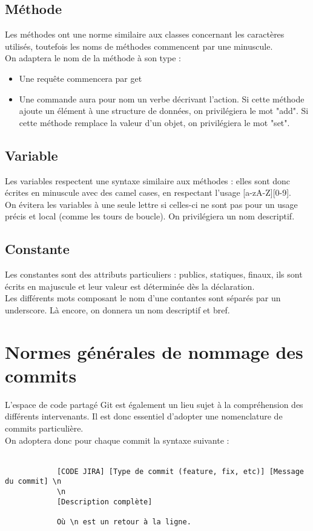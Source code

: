 \documentclass{article}
\begin{document}
        \subsection{Méthode}
            Les méthodes ont une norme similaire aux classes concernant les caractères utilisés, toutefois les noms de méthodes commencent par une minuscule. \\
            On adaptera le nom de la méthode à son type : 
            \begin{itemize}
                \item Une requête commencera par get
                \item Une commande aura pour nom un verbe décrivant l'action. Si cette méthode ajoute un élément à une structure de données, on privilégiera le mot "add". Si cette méthode remplace la valeur d'un objet, on privilégiera le mot "set".
            \end{itemize}

        \subsection{Variable}
            Les variables respectent une syntaxe similaire aux méthodes : elles sont donc écrites en minuscule avec des camel cases, en respectant l'usage [a-zA-Z][0-9]. \\
            \indent On évitera les variables à une seule lettre si celles-ci ne sont pas pour un usage précis et local (comme les tours de boucle). On privilégiera un nom descriptif.

        \subsection{Constante}
            Les constantes sont des attributs particuliers : publics, statiques, finaux, ils sont écrits en majuscule et leur valeur est déterminée dès la déclaration. \\
            Les différents mots composant le nom d'une contantes sont séparés par un underscore. Là encore, on donnera un nom descriptif et bref.

\newpage
    \section{Normes générales de nommage des commits}
        L'espace de code partagé Git est également un lieu sujet à la compréhension des différents intervenants. Il est donc essentiel d'adopter une nomenclature de commits particulière.\\
        \indent On adoptera donc pour chaque commit la syntaxe suivante : \\
        \\
        \begin{verbatim}
            [CODE JIRA] [Type de commit (feature, fix, etc)] [Message du commit] \n
            \n
            [Description complète]

            Où \n est un retour à la ligne.
        \end{verbatim}
        
\end{document}
